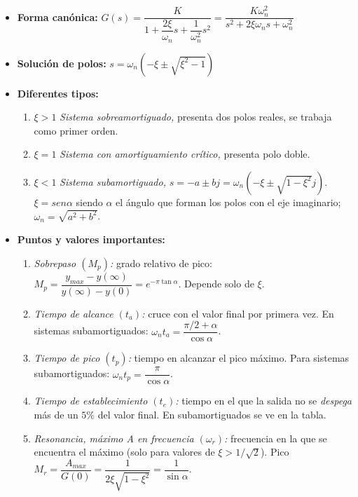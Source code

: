 \documentclass[a4paper, twocolumn, 10pt]{article}
\begin{document}
\begin{itemize}
	\item \textbf{Forma canónica:} $G(s) = \dfrac{K}{1 + \dfrac{2\xi}{\omega_n}s + \dfrac{1}{\omega^2_n}s^2} = \dfrac{K\omega^2_n}{s^2 + 2\xi\omega_ns + \omega^2_n}$
	\item \textbf{Solución de polos:} $s = \omega_n\left(-\xi \pm \sqrt{\xi^2 -1}\right)$
	\item \textbf{Diferentes tipos:}
	\begin{enumerate}
		\item $\xi > 1$ \textit{Sistema sobreamortiguado,} presenta dos polos reales, se trabaja como primer orden.
		\item $\xi = 1$ \textit{Sistema con amortiguamiento crítico,} presenta polo doble.
		\item $\xi < 1$ \textit{Sistema subamortiguado,} $s = -a \pm bj = \omega_n\left(-\xi \pm \sqrt{1 - \xi^2}j\right)$. $\xi = sen\alpha$ siendo $\alpha$ el ángulo que forman los polos con el eje imaginario; $\omega_n = \sqrt{a^2 + b^2}$.
	\end{enumerate}
	\item \textbf{Puntos y valores importantes:}
	\begin{enumerate}
		\item \textit{Sobrepaso $(M_p)$:} grado relativo de pico: $M_p = \dfrac{y_{max}-y(\infty)}{y(\infty)-y(0)} = e^{-\pi\tan\alpha}$. Depende solo de $\xi$.
		\item \textit{Tiempo de alcance $(t_a)$:} cruce con el valor final por primera vez. En sistemas subamortiguados: $\omega_nt_a = \dfrac{\pi/2 +\alpha}{\cos\alpha}$.
		\item \textit{Tiempo de pico $(t_p)$:} tiempo en alcanzar el pico máximo. Para sistemas subamortiguados: $\omega_nt_p = \dfrac{\pi}{\cos\alpha}$.
		\item \textit{Tiempo de establecimiento $(t_e)$:} tiempo en el que la salida no se \textit{despega} más de un $5\%$ del valor final. En subamortiguados se ve en la tabla.
		\item \textit{Resonancia, máximo A en frecuencia $(\omega_r)$:} frecuencia en la que se encuentra el máximo (solo para valores de $\xi > 1/\sqrt{2}$). Pico $M_r = \dfrac{A_{max}}{G(0)} = \dfrac{1}{2\xi\sqrt{1-\xi^2}} = \dfrac{1}{\sin\alpha}$.
	\end{enumerate}
\end{itemize}
\end{document}
